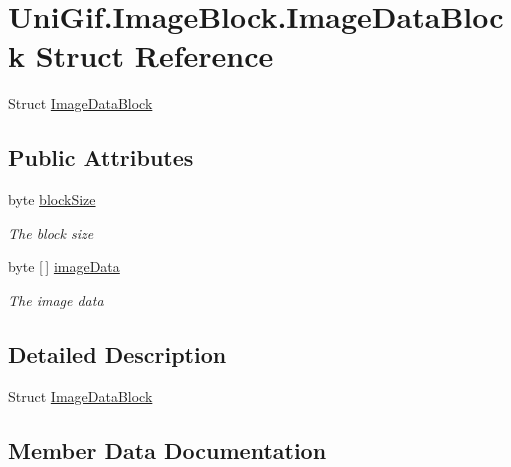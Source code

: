 \hypertarget{struct_uni_gif_1_1_image_block_1_1_image_data_block}{}\section{Uni\+Gif.\+Image\+Block.\+Image\+Data\+Block Struct Reference}
\label{struct_uni_gif_1_1_image_block_1_1_image_data_block}


Struct \hyperlink{struct_uni_gif_1_1_image_block_1_1_image_data_block}{Image\+Data\+Block}  


\subsection*{Public Attributes}
\begin{DoxyCompactItemize}
\item 
byte \hyperlink{struct_uni_gif_1_1_image_block_1_1_image_data_block_a873f916735f93e4e817c31d97a7f5580}{block\+Size}
\begin{DoxyCompactList}\small\item\em The block size \end{DoxyCompactList}\item 
byte \mbox{[}$\,$\mbox{]} \hyperlink{struct_uni_gif_1_1_image_block_1_1_image_data_block_a2a5c00f84fea5acf92b2bf324dcb440e}{image\+Data}
\begin{DoxyCompactList}\small\item\em The image data \end{DoxyCompactList}\end{DoxyCompactItemize}


\subsection{Detailed Description}
Struct \hyperlink{struct_uni_gif_1_1_image_block_1_1_image_data_block}{Image\+Data\+Block} 



\subsection{Member Data Documentation}
\mbox{\label{struct_uni_gif_1_1_image_block_1_1_image_data_block_a873f916735f93e4e817c31d97a7f5580}} 
